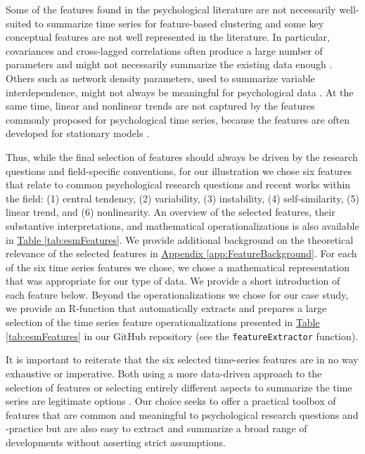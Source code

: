 \documentclass[man, 12pt, a4paper, mask, floatsintext]{apa7}
\theoremstyle{break}
\theoremstyle{plain}
\newcommand{\tblref}[2][]{\hyperref[#2]{Table \ref*{#2}#1}}
\newcommand{\appref}[2][]{\hyperref[#2]{Appendix \ref*{#2}#1}}
\begin{document}
Some of the features found in the psychological literature are not necessarily well-suited to summarize time series for feature-based clustering and some key conceptual features are not well represented in the literature. In particular, covariances and cross-lagged correlations often produce a large number of parameters and might not necessarily summarize the existing data enough \citep{ernst2021}. Others such as network density parameters, used to summarize variable interdependence, might not always be meaningful for psychological data \citep{bringmann2019a}. At the same time, linear and nonlinear trends are not captured by the features commonly proposed for psychological time series, because the features are often developed for stationary models \citep[e.g.,][]{krone2018}. 

Thus, while the final selection of features should always be driven by the research questions and field-specific conventions, for our illustration we chose six features that relate to common psychological research questions and recent works within the field: (1) central tendency, (2) variability, (3) instability, (4) self-similarity, (5) linear trend, and (6) nonlinearity. An overview of the selected features, their substantive interpretations, and mathematical operationalizations is also available in \tblref{tab:esmFeatures}. We provide additional background on the theoretical relevance of the selected features in \appref{app:FeatureBackground}. For each of the six time series features we chose, we chose a mathematical representation that was appropriate for our type of data. We provide a short introduction of each feature below. Beyond the operationalizations we chose for our case study, we provide an R-function that automatically extracts and prepares a large selection of the time series feature operationalizations presented in \tblref{tab:esmFeatures} in our GitHub repository (see the \texttt{featureExtractor} function).





It is important to reiterate that the six selected time-series features are in no way exhaustive or imperative. Both using a more data-driven approach to the selection of features or selecting entirely different aspects to summarize the time series are legitimate options \citep[e.g., see][]{heylen2016}. Our choice seeks to offer a practical toolbox of features that are common and meaningful to psychological research questions and -practice but are also easy to extract and summarize a broad range of developments without asserting strict assumptions.
\end{document}
